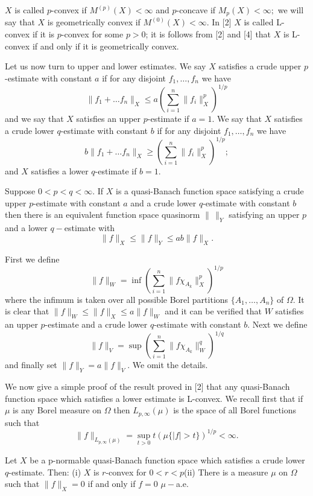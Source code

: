 $X$ is called $p$-convex if $M^{(p)}(X)<\infty$ and $p$-concave if
$M_p(X)<\infty;$ we will say that $X$ is geometrically convex if
$M^{(0)}(X)<\infty.$ In [2] $X$ is called L-convex if it is $p$-convex
for some $p>0$; it is follows from [2] and [4] that $X$ is L-convex if
and only if it is geometrically convex.
 
Let us now turn to upper and lower estimates.  We say $X$ satisfies a
crude upper $p$-estimate with constant $a$ if for any disjoint
$f_1,\ldots,f_n$ we have $$ \|f_1+\ldots f_n\|_X \le
a(\sum_{i=1}^n\|f_i\|_X^p)^{1/p}$$ and we say that $X$ satisfies an
upper $p$-estimate if $a=1.$ We say that $X$ satisfies a crude lower
$q$-estimate with constant $b$ if for any disjoint $f_1,\ldots,f_n$ we
have $$ b\|f_1+\ldots f_n\|_X \ge (\sum_{i=1}^n\|f_i\|_X^p)^{1/p};$$ and
$X$ satisfies a lower $q$-estimate if $b=1.$
 
 
 
Suppose $0<p<q<\infty.$ If $X$ is a quasi-Banach
function space satisfying a crude upper $p$-estimate with constant $a$
and a crude lower $q$-estimate with constant $b$ then there is an
equivalent function space quasinorm $\|\,\|_Y$ satisfying an upper $p$
and a lower $q-$estimate with $$ \|f\|_X \le \|f\|_Y \le ab\|f\|_X.$$
\endproclaim
 
 
First we define $$ \|f\|_W =\inf
(\sum_{i=1}^n\|f\chi_{A_k}\|_X^p)^{1/p}$$ where the infimum is taken
over all possible Borel partitions $\{A_1,\ldots,A_n\}$ of $\Omega$.  It
is clear that $\|f\|_W\le \|f\|_X\le a\|f\|_W$ and it can be verified
that $W$ satisfies an upper $p$-estimate and a crude lower $q$-estimate
with constant $b$.  Next we define $$ \|f\|_V =\sup
(\sum_{i=1}^n\|f\chi_{A_k}\|_W^q)^{1/q}$$ and finally set
$\|f\|_Y=a\|f\|_V$.  We omit the details.\bull\enddemo
 
We now give a simple proof of the result proved in [2] that any
quasi-Banach function space which satisfies a lower estimate is
L-convex.  We recall first that if $\mu$ is any Borel measure on
$\Omega$ then $L_{p,\infty}(\mu)$ is the space of all Borel functions
such that $$ \|f\|_{L_{p,\infty}(\mu)} = \sup_{t>0}
t(\mu\{|f|>t\})^{1/p}<\infty.$$
 
Let $X$ be a p-normable quasi-Banach function
space which satisfies a crude lower $q$-estimate.  Then:  \newline (i)
$X$ is $r$-convex for $0<r<p$\newline (ii) There is a measure $\mu$ on
$\Omega$ such that $\|f\|_X=0$ if and only if $f=0$ $\mu-$a.e.
\endproclaim
 
